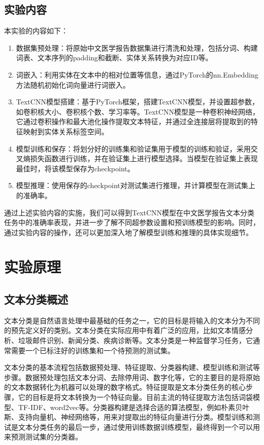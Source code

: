 \documentclass{report}
\begin{document}
	\section{实验内容}
	本实验的内容如下：
	\begin{enumerate}
		\item 数据集预处理：将原始中文医学报告数据集进行清洗和处理，包括分词、构建词表、文本序列的padding和截断、实体关系转换为对应ID等。
		
		\item 词嵌入：利用实体在文本中的相对位置等信息，通过PyTorch的nn.Embedding方法随机初始化词向量进行词嵌入。
		
		\item TextCNN模型搭建：基于PyTorch框架，搭建TextCNN模型，并设置超参数，如卷积核大小、卷积核个数、学习率等。TextCNN模型是一种卷积神经网络，它通过卷积操作和最大池化操作提取文本特征，并通过全连接层将提取到的特征映射到实体关系标签空间。
		
		\item 模型训练和保存：将划分好的训练集和验证集用于模型的训练和验证，采用交叉熵损失函数进行训练，并在验证集上进行模型选择。当模型在验证集上表现最佳时，将该模型保存为checkpoint。
		
		\item 模型推理：使用保存的checkpoint对测试集进行推理，并计算模型在测试集上的准确率。
	\end{enumerate}
	
	通过上述实验内容的实施，我们可以得到TextCNN模型在中文医学报告文本分类任务中的准确率表现，并进一步了解不同超参数设置和预训练模型的影响。同时，通过实验内容的操作，还可以更加深入地了解模型训练和推理的具体实现细节。
	
	
	\chapter{实验原理}
	\section{文本分类概述}
	文本分类是自然语言处理中最基础的任务之一，它的目标是将输入的文本分为不同的预先定义好的类别。文本分类在实际应用中有着广泛的应用，比如文本情感分析、垃圾邮件识别、新闻分类、疾病诊断等。文本分类是一种监督学习任务，它通常需要一个已标注好的训练集和一个待预测的测试集。
	
	文本分类的基本流程包括数据预处理、特征提取、分类器构建、模型训练和测试等步骤。数据预处理包括文本分词、去除停用词、数字化等，它的主要目的是将原始的文本数据转化为机器可以处理的数字格式。特征提取是文本分类任务的核心步骤，它的目标是将文本转换为一个特征向量。目前主流的特征提取方法包括词袋模型、TF-IDF、word2vec等。分类器构建是选择合适的算法模型，例如朴素贝叶斯、支持向量机、神经网络等，用来对提取出的特征向量进行分类。模型训练和测试是文本分类任务的最后一步，通过使用训练数据训练模型，最终得到一个可以用来预测测试集的分类器。
	
\end{document}
